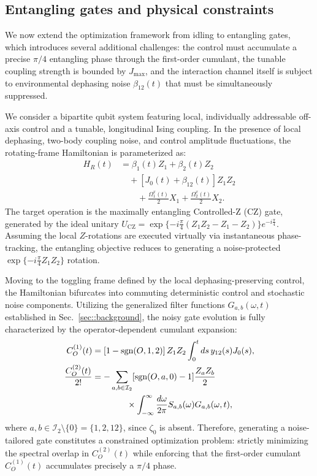 \documentclass[%
 reprint,
superscriptaddress,
 amsmath,amssymb,
 aps,
pra,
]{revtex4-2}
\newcommand{\qk}[1]{{\color{OliveGreen}#1}}
\begin{document}
\subsection{Entangling gates and physical constraints}

\qk{We now extend the optimization framework from idling to entangling gates, which introduces several additional challenges: the control must accumulate a precise $\pi/4$ entangling phase through the first-order cumulant, the tunable coupling strength is bounded by $J_{\text{max}}$, and the interaction channel itself is subject to environmental dephasing noise $\beta_{12}(t)$ that must be simultaneously suppressed.}

We consider a bipartite qubit system featuring local, individually addressable off-axis control and a tunable, longitudinal Ising coupling. In the presence of local dephasing, two-body coupling noise, and control amplitude fluctuations, the rotating-frame Hamiltonian is parameterized as:
\begin{align}
    H_R(t)&=\beta_1(t)Z_1+\beta_2(t)Z_2 \nonumber\\
    & \quad +\left[J_0(t)+\beta_{12}(t)\right]Z_1Z_2\nonumber\\
    & \qquad +\frac{\Omega_1^x(t)}{2}X_1+\frac{\Omega_2^x(t)}{2}X_2.
\end{align}
The target operation is the maximally entangling Controlled-Z (CZ) gate, generated by the ideal unitary $U_{\text{CZ}} = \exp\{-i\frac{\pi}{4}(Z_1Z_2 - Z_1 - Z_2)\}e^{-i\frac{\pi}{4}}$. Assuming the local $Z$-rotations are executed virtually via instantaneous phase-tracking, the entangling objective reduces to generating a noise-protected $\exp\{-i\frac{\pi}{4}Z_1Z_2\}$ rotation.

Moving to the toggling frame defined by the local dephasing-preserving control, the Hamiltonian bifurcates into commuting deterministic control and stochastic noise components. Utilizing the generalized filter functions $G_{a,b}(\omega,t)$ established in Sec.~\ref{sec::background}, the noisy gate evolution is fully characterized by the operator-dependent cumulant expansion:
\begin{align}
    C_O^{(1)}(t)&=\left[1-\text{sgn}(O,1,2)\right]Z_1Z_2\int_0^t ds \, y_{12}(s)J_0(s),\\
    \frac{C_{O}^{(2)}(t)}{2!}&=-\sum_{a,b\in\mathcal{I}_2}[\text{sgn}(O,a,0)-1]\frac{Z_aZ_b}{2}\notag\\
    &\qquad\qquad\times\int_{-\infty}^{\infty}\frac{d\omega}{2\pi}S_{a,b}(\omega)G_{a,b}(\omega,t),
\end{align}
where \qk{$a,b\in\mathcal{I}_2\setminus\{0\}=\{1,2,12\}$, since $\zeta_0$ is absent}. Therefore, generating a noise-tailored gate constitutes a constrained optimization problem: strictly minimizing the spectral overlap in $C_O^{(2)}(t)$ while enforcing that the first-order cumulant $C_O^{(1)}(t)$ accumulates precisely a $\pi/4$ phase.
\end{document}
